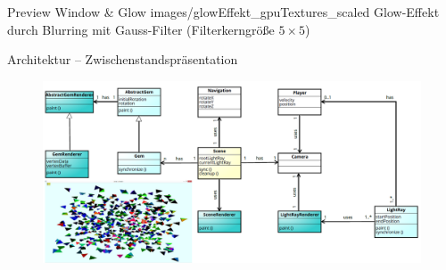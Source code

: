 {
	\begin{figure}
		\centering
	\end{figure}
}

\slidegraphic
{Preview Window \& Glow}
{images/glowEffekt_gpuTextures_scaled}
{Glow-Effekt durch Blurring mit Gauss-Filter (Filterkerngröße $5\times 5$)}

\begin{frame}{Architektur -- Zwischenstandspräsentation}
	\begin{figure}
		\centering
		\includegraphics[width=\textwidth, height=0.8\textheight, keepaspectratio]{images/klassendiagramm}
	\end{figure}
\end{frame}

